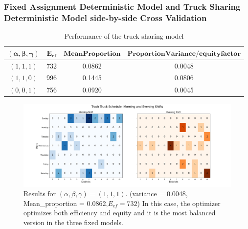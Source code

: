 \documentclass{article}
\begin{document}
\subsubsection{Fixed Assignment Deterministic Model and Truck Sharing Deterministic Model side-by-side Cross Validation}

\begin{table}[H]
\centering
\begin{tabular}{|c|c|c|c|}
\hline
$\mathbf{(\alpha, \beta,\gamma)}$ & $\mathbf{E_{ef}}$ & $\mathbf{Mean Proportion}$ & $\mathbf{Proportion Variance/equity factor}$ \\ \hline
$(1,1,1)$    &     732         &  0.0862    &  0.0048      \\ \hline
$(1,1,0)$     &  996         &  0.1445  &   0.0806  \\ \hline
$(0,0,1)$      &   756         &   0.0920  &  0.0045    \\ \hline
\end{tabular}
\caption{Performance of the truck sharing model}
\label{tab:Fixed Assignment Model}
\end{table}

\begin{figure}[H]
	\centering
	\includegraphics[width=1\textwidth]{figures/figures fixed/Prioritize TCT TGC PGC fixed model.png}
	\caption{Results for $(\alpha, \beta,\gamma) = (1,1,1)$. (variance =  0.0048, Mean\_proportion = 0.0862,$E_{ef} = 732$) In this case, the optimizer optimizes both efficiency and equity and it is the most balanced version in the three fixed models.}
\end{figure}
\end{document}
